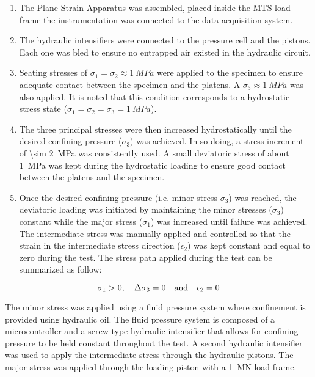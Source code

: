 \begin{enumerate}
    \item The Plane-Strain Apparatus was assembled, placed inside the MTS load frame the instrumentation was connected to the data acquisition system.
    \item The hydraulic intensifiers were connected to the pressure cell and the pistons. Each one was bled to ensure no entrapped air existed in the hydraulic circuit. 
    \item Seating stresses of $\sigma_1 = \sigma_2 \approx \SI{1}{MPa}$ were applied to the specimen to ensure adequate contact between the specimen and the platens. A $\sigma_3 \approx \SI{1}{MPa}$ was also applied. It is noted that this condition corresponds to a hydrostatic stress state ($\sigma_1 = \sigma_2 = \sigma_3 = \SI{1}{MPa}$).
    \item The three principal stresses were then increased hydrostatically until the desired confining pressure ($\sigma_3$) was achieved. In so doing, a stress increment of \SI{\sim 2}{MPa} was consistently used. A small deviatoric stress of about \SI{1}{MPa} was kept during the hydrostatic loading to ensure good contact between the platens and the specimen.
    \item Once the desired confining pressure (i.e. minor stress $\sigma_3$) was reached, the deviatoric loading was initiated by maintaining the minor stresses ($\sigma_3$) constant while the major stress ($\sigma_1$) was increased until failure was achieved. The intermediate stress was manually applied and controlled so that the strain in the intermediate stress direction ($\epsilon_2$) was kept constant and equal to zero during the test.  The stress path applied during the test can be summarized as follow:
\end{enumerate}

\begin{equation}
    \sigma_1 > 0 ,\quad \Delta\sigma_3 = 0 \quad \textmd{and} \quad \epsilon_2= 0
\end{equation}

The minor stress was applied using a fluid pressure system where confinement is provided using hydraulic oil. The fluid pressure system is composed of a microcontroller and a screw-type hydraulic intensifier that allows for confining pressure to be held constant throughout the test. A second hydraulic intensifier was used to apply the intermediate stress through the hydraulic pistons. The major stress was applied through the loading piston with a \SI{1}{\mega\newton} load frame. 

